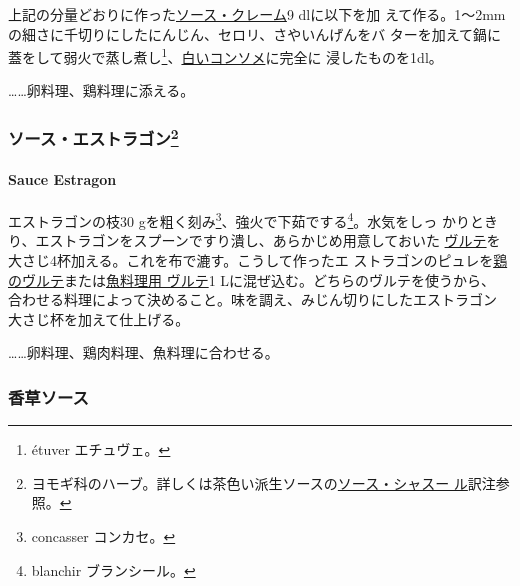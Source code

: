 \begin{recette}
上記の分量どおりに作った\protect\hyperlink{sauce-creme}{ソース・クレーム}9
dlに以下を加
えて作る。1〜2mmの細さに千切りにしたにんじん、セロリ、さやいんげんをバ
ターを加えて鍋に蓋をして弱火で蒸し煮し\footnote{étuver エチュヴェ。}、\protect\hyperlink{}{白いコンソメ}に完全に
浸したものを1dl。

\noindent\ldots{}\ldots{}卵料理、鶏料理に添える。

\maeaki

\hypertarget{ux30bdux30fcux30b9ux30a8ux30b9ux30c8ux30e9ux30b4ux30f350}{%
\subsubsection[ソース・エストラゴン]{\texorpdfstring{ソース・エストラゴン\footnote{ヨモギ科のハーブ。詳しくは茶色い派生ソースの\protect\hyperlink{sauce-chasseur}{ソース・シャスー
  ル}訳注参照。}}{ソース・エストラゴン}}\label{ux30bdux30fcux30b9ux30a8ux30b9ux30c8ux30e9ux30b4ux30f350}}

\hypertarget{sauce-estragon-blanche}{%
\paragraph{Sauce Estragon}\label{sauce-estragon-blanche}}


エストラゴンの枝30 gを粗く刻み\footnote{concasser コンカセ。}、強火で下茹でする\footnote{blanchir
  ブランシール。}。水気をしっ
かりときり、エストラゴンをスプーンですり潰し、あらかじめ用意しておいた
\protect\hyperlink{veloute}{ヴルテ}を大さじ4杯加える。これを布で漉す。こうして作ったエ
ストラゴンのピュレを\protect\hyperlink{veloute-de-volaille}{鶏のヴルテ}または\protect\hyperlink{veloute-de-poisson}{魚料理用
ヴルテ}1 Lに混ぜ込む。どちらのヴルテを使うから、
合わせる料理によって決めること。味を調え、みじん切りにしたエストラゴン
大さじ\undemi{}杯を加えて仕上げる。

\ldots{}\ldots{}卵料理、鶏肉料理、魚料理に合わせる。

\maeaki

\hypertarget{ux9999ux8349ux30bdux30fcux30b9}{%
\subsubsection{香草ソース}\label{ux9999ux8349ux30bdux30fcux30b9}}


\end{recette}
